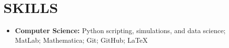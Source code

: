 \documentclass[a4paper,9pt]{extarticle}
\begin{document}
\section*{SKILLS}
\begin{itemize}
    \item \textbf{Computer Science:} Python scripting, simulations, and data science; MatLab; Mathematica; Git; GitHub; \LaTeX
\end{itemize}

\end{document}
